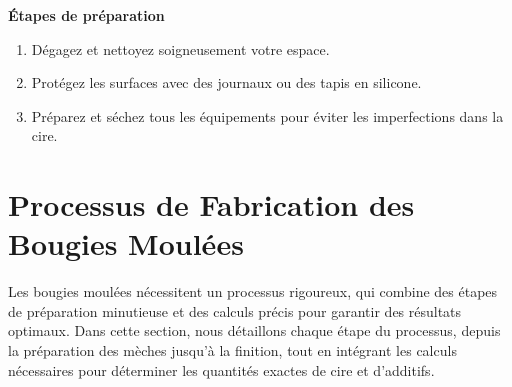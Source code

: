 \documentclass[11pt,fleqn,onecolumn,oneside]{book}
\begin{document}
\begin{exercise}
\textbf{Étapes de préparation}
\begin{enumerate}
    \item Dégagez et nettoyez soigneusement votre espace.
    \item Protégez les surfaces avec des journaux ou des tapis en silicone.
    \item Préparez et séchez tous les équipements pour éviter les imperfections dans la cire.
\end{enumerate}
\end{exercise}

\section{Processus de Fabrication des Bougies Moulées}

Les bougies moulées nécessitent un processus rigoureux, qui combine des étapes de préparation minutieuse et des calculs précis pour garantir des résultats optimaux. Dans cette section, nous détaillons chaque étape du processus, depuis la préparation des mèches jusqu’à la finition, tout en intégrant les calculs nécessaires pour déterminer les quantités exactes de cire et d’additifs.
\end{document}
